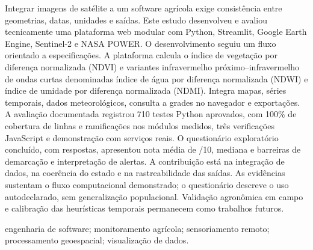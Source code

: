 \begin{resumo}
Integrar imagens de satélite a um software agrícola exige consistência entre geometrias, datas, unidades e saídas. Este estudo desenvolveu e avaliou tecnicamente uma plataforma web modular com Python, Streamlit, Google Earth Engine, Sentinel-2 e NASA POWER. O desenvolvimento seguiu um fluxo orientado a especificações. A plataforma calcula o índice de vegetação por diferença normalizada (NDVI) e variantes infravermelho próximo--infravermelho de ondas curtas denominadas índice de água por diferença normalizada (NDWI) e índice de umidade por diferença normalizada (NDMI). Integra mapas, séries temporais, dados meteorológicos, consulta a grades no navegador e exportações. A avaliação documentada registrou 710 testes Python aprovados, com 100\% de cobertura de linhas e ramificações nos módulos medidos, três verificações JavaScript e demonstração com serviços reais. O questionário exploratório concluído, com \UsuariosN{} respostas, apresentou nota média de \UsuariosMedia{}/10, mediana \UsuariosMediana{} e barreiras de demarcação e interpretação de alertas. A contribuição está na integração de dados, na coerência do estado e na rastreabilidade das saídas. As evidências sustentam o fluxo computacional demonstrado; o questionário descreve o uso autodeclarado, sem generalização populacional. Validação agronômica em campo e calibração das heurísticas temporais permanecem como trabalhos futuros.
\end{resumo}
\begin{palavras_chave}
engenharia de software; monitoramento agrícola; sensoriamento remoto; processamento geoespacial; visualização de dados.
\end{palavras_chave}
